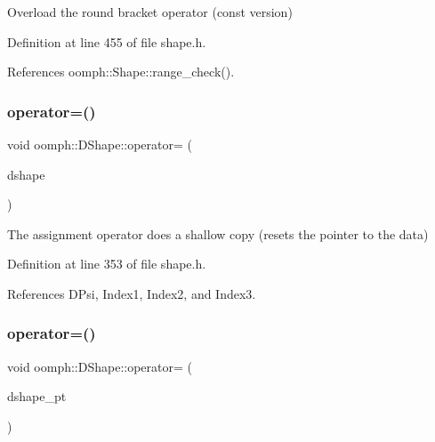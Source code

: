 Overload the round bracket operator (const version) 



Definition at line 455 of file shape.\+h.



References oomph\+::\+Shape\+::range\+\_\+check().

\mbox{\label{classoomph_1_1DShape_a65273775f2720c51a7d4c2e9b5d5a8a9}} 
\subsubsection{\texorpdfstring{operator=()}{operator=()}\hspace{0.1cm}{\footnotesize\ttfamily [1/2]}}
{\footnotesize\ttfamily void oomph\+::\+D\+Shape\+::operator= (\begin{DoxyParamCaption}\item[{const \hyperlink{classoomph_1_1DShape}{D\+Shape} \&}]{dshape }\end{DoxyParamCaption})\hspace{0.3cm}{\ttfamily [inline]}}

The assignment operator does a shallow copy (resets the pointer to the data) 

Definition at line 353 of file shape.\+h.



References D\+Psi, Index1, Index2, and Index3.

\mbox{\label{classoomph_1_1DShape_a50bb345fa38feb3b72244d94a0dbaf50}} 
\subsubsection{\texorpdfstring{operator=()}{operator=()}\hspace{0.1cm}{\footnotesize\ttfamily [2/2]}}
{\footnotesize\ttfamily void oomph\+::\+D\+Shape\+::operator= (\begin{DoxyParamCaption}\item[{\hyperlink{classoomph_1_1DShape}{D\+Shape} $\ast$const \&}]{dshape\+\_\+pt }\end{DoxyParamCaption})\hspace{0.3cm}{\ttfamily [inline]}}

